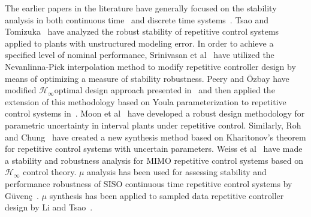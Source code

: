 \documentclass[12pt,draftcls,onecolumn]{IEEEtran}
\begin{document}
The earlier papers in the literature have generally focused on the stability analysis in both continuous time~\cite{HYO+:88, SrS:91} and discrete time systems~\cite{TTC:89}. Tsao and Tomizuka~\cite{TsT:94} have analyzed the robust stability of repetitive control systems applied to plants with unstructured modeling error. In order to achieve a specified level of nominal performance, Srinivasan et al~\cite{SOJ:95} have utilized the
Nevanlinna-Pick interpolation method to modify repetitive controller design by means of optimizing a measure of stability
robustness. Peery and \"Ozbay have modified $\mathcal{H}_{\infty}$optimal design approach presented in~\cite{Ozb:93} and then applied the extension of this methodology based on Youla parameterization to repetitive control systems in~\cite{PeO:97}. Moon et al~\cite{MLC:98} have developed a robust design methodology for parametric uncertainty in interval plants under repetitive control. Similarly, Roh and Chung~\cite{RoC:95} have created a new synthesis method based on Kharitonov's theorem for repetitive control systems with uncertain parameters. Weiss et al~\cite{WeH:99, WZG+:04, ZLW+:06} have made a stability and robustness analysis for MIMO
repetitive control systems based on $\mathcal{H}_{\infty}$ control theory. $\mu$ analysis has been used for assessing stability and performance robustness of SISO continuous time repetitive control systems by G\"uven\c{c}~\cite{Guv:96}. $\mu$ synthesis has been applied to sampled data repetitive controller design by Li and Tsao~\cite{LiT:98}.
\end{document}
